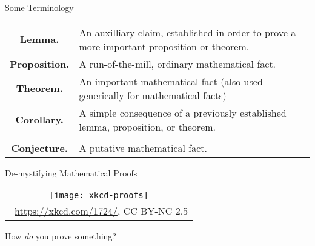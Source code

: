 \documentclass[../slides.tex]{subfiles}
\begin{document}
\begin{frame}{Some Terminology}

	\begin{center}
	
		\begin{tabular}{c  p{.75\linewidth}}
			
			\textbf{Lemma.} & An auxilliary claim, established in order to prove a more important proposition or theorem.\\
			
			\textbf{Proposition.} & A run-of-the-mill, ordinary mathematical fact.\\
			
			\textbf{Theorem.} & An important mathematical fact (also used generically for mathematical facts)\\
			
			\textbf{Corollary.} & A simple consequence of a previously established lemma, proposition, or theorem.\\[2ex]
			
	\hline\\[2ex]
	
	
\textbf{Conjecture.} & A putative mathematical fact.	
	
	
		\end{tabular}
	\end{center}


\end{frame}

\begin{frame}{De-mystifying Mathematical Proofs}

	\begin{center}
		\begin{tabular}{c}
		\texttt{[image: xkcd-proofs]}\\[-1ex]
		{\tiny \textcopyright~\url{https://xkcd.com/1724/}, CC BY-NC 2.5}
		\end{tabular}
		\end{center}
		
	How \emph{do} you prove something?

\end{frame}
\end{document}
